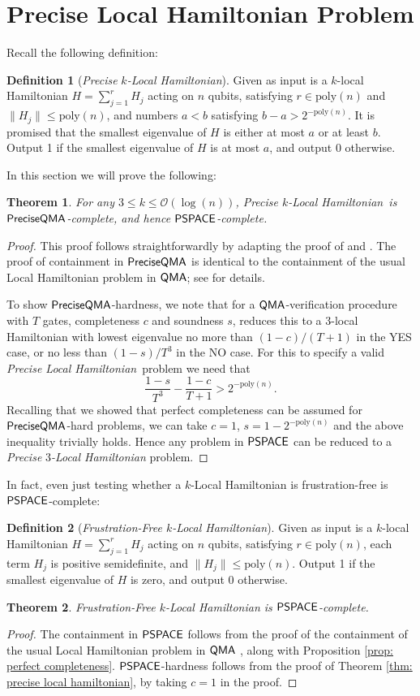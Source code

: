 \documentclass[11pt]{article}
\newtheorem{theorem}{Theorem}
\theoremstyle{definition}
\theoremstyle{remark}
\theoremstyle{definition}
\newtheorem{definition}{Definition}
\newcommand\QMA{{\sf{QMA}}}
\newcommand\PSPACE{{\sf{PSPACE}}}
\newcommand\QMAexp{{\sf{PreciseQMA}}}
\newcommand\preciselh{\textit{Precise Local Hamiltonian}}
\newcommand\preciseklh{\textit{Precise }$k$\textit{-Local Hamiltonian}}
\newcommand\preciseilh[1]{\textit{Precise }\ensuremath{#1}\textit{-Local Hamiltonian}}
\newcommand{\poly}{\textrm{poly}}
\begin{document}
\section{Precise Local Hamiltonian Problem}\label{app:localhamiltonian}
Recall the following definition:
\begin{definition}[\preciseklh]
Given as input is a $k$-local Hamiltonian $H=\sum_{j=1}^rH_j$ acting on $n$ qubits, satisfying $r \in \poly(n)$ and $\|H_j\| \le \poly(n)$, and numbers $a < b$ satisfying $b - a > 2^{-\poly(n)}$. It is promised that the smallest eigenvalue of $H$ is either at most $a$ or at least $b$. Output 1 if the smallest eigenvalue of $H$ is at most $a$, and output 0 otherwise.
\end{definition}
In this section we will prove the following:
\begin{theorem}
For any $3 \le k \le \mathcal{O}(\log(n))$, \preciseklh \ is $\QMAexp$-complete, and hence $\PSPACE$-complete.
\end{theorem}
\begin{proof}
This proof follows straightforwardly by adapting the proof of \cite{ksv02} and \cite{kr03}. The proof of containment in $\QMAexp$ is identical to the containment of the usual Local Hamiltonian problem in $\QMA$; see \cite{ksv02} for details.

To show $\QMAexp$-hardness, we note that for a $\QMA$-verification procedure with $T$ gates, completeness $c$ and soundness $s$, \cite{kr03} reduces this to a 3-local Hamiltonian with lowest eigenvalue no more than $(1-c) / (T+1)$ in the YES case, or no less than $(1-s) / T^3$ in the NO case. For this to specify a valid \preciselh \ problem we need that
\begin{equation} \label{eq:preciselh_condition}
\frac{1-s}{T^3} - \frac{1-c}{T+1} > 2^{-\poly(n)}.
\end{equation}
Recalling that we showed that perfect completeness can be assumed for $\QMAexp$-hard problems, we can take $c=1$, $s = 1-2^{-\poly(n)}$ and the above inequality trivially holds. Hence any problem in $\PSPACE$ can be reduced to a \preciseilh{3} problem.
\end{proof}
In fact, even just testing whether a $k$-Local Hamiltonian is frustration-free is $\PSPACE$-complete: \begin{definition} [\emph{Frustration-Free $k$-Local Hamiltonian}] Given as input is a $k$-local Hamiltonian $H=\sum_{j=1}^rH_j$ acting on $n$ qubits, satisfying $r \in \poly(n)$, each term $H_j$ is positive semidefinite, and $\|H_j\| \le \poly(n)$. Output 1 if the smallest eigenvalue of $H$ is zero, and output 0 otherwise.
\end{definition}
\begin{theorem}
Frustration-Free $k$-Local Hamiltonian is $\PSPACE$-complete.
\end{theorem}
\begin{proof}
The containment in $\PSPACE$ follows from the proof of the containment of the usual Local Hamiltonian problem in $\QMA$ \cite{ksv02}, along with Proposition \ref{prop: perfect completeness}. $\PSPACE$-hardness follows from the proof of Theorem \ref{thm: precise local hamiltonian}, by taking $c=1$ in the proof.
\end{proof}
\end{document}
